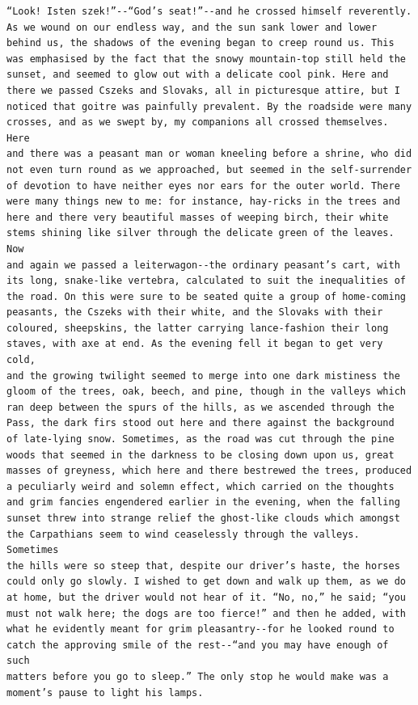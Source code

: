 \documentclass{article}
\begin{document}
\begin{verbatim}
“Look! Isten szek!”--“God’s seat!”--and he crossed himself reverently.
As we wound on our endless way, and the sun sank lower and lower
behind us, the shadows of the evening began to creep round us. This
was emphasised by the fact that the snowy mountain-top still held the
sunset, and seemed to glow out with a delicate cool pink. Here and
there we passed Cszeks and Slovaks, all in picturesque attire, but I
noticed that goitre was painfully prevalent. By the roadside were many
crosses, and as we swept by, my companions all crossed themselves. Here
and there was a peasant man or woman kneeling before a shrine, who did
not even turn round as we approached, but seemed in the self-surrender
of devotion to have neither eyes nor ears for the outer world. There
were many things new to me: for instance, hay-ricks in the trees and
here and there very beautiful masses of weeping birch, their white
stems shining like silver through the delicate green of the leaves. Now
and again we passed a leiterwagon--the ordinary peasant’s cart, with
its long, snake-like vertebra, calculated to suit the inequalities of
the road. On this were sure to be seated quite a group of home-coming
peasants, the Cszeks with their white, and the Slovaks with their
coloured, sheepskins, the latter carrying lance-fashion their long
staves, with axe at end. As the evening fell it began to get very cold,
and the growing twilight seemed to merge into one dark mistiness the
gloom of the trees, oak, beech, and pine, though in the valleys which
ran deep between the spurs of the hills, as we ascended through the
Pass, the dark firs stood out here and there against the background
of late-lying snow. Sometimes, as the road was cut through the pine
woods that seemed in the darkness to be closing down upon us, great
masses of greyness, which here and there bestrewed the trees, produced
a peculiarly weird and solemn effect, which carried on the thoughts
and grim fancies engendered earlier in the evening, when the falling
sunset threw into strange relief the ghost-like clouds which amongst
the Carpathians seem to wind ceaselessly through the valleys. Sometimes
the hills were so steep that, despite our driver’s haste, the horses
could only go slowly. I wished to get down and walk up them, as we do
at home, but the driver would not hear of it. “No, no,” he said; “you
must not walk here; the dogs are too fierce!” and then he added, with
what he evidently meant for grim pleasantry--for he looked round to
catch the approving smile of the rest--“and you may have enough of such
matters before you go to sleep.” The only stop he would make was a
moment’s pause to light his lamps.


\end{verbatim}
\end{document}
